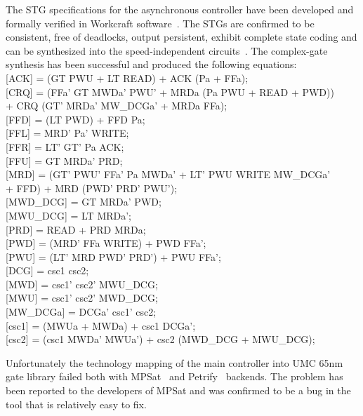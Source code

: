 \documentclass[twocolumn,conference]{IEEEtran}
\begin{document}
The STG specifications for the asynchronous controller have been developed and formally verified in Workcraft software~\cite{Sokolov-2016-book-Workcraft}. The STGs are confirmed to be consistent, free of deadlocks, output persistent, exhibit complete state coding and can be synthesized into the speed-independent circuits~\cite{Muller-1959-ts}. The complex-gate synthesis has been successful and produced the following equations:\\
\footnotesize
\textsf{[ACK] = (GT PWU + LT READ) + ACK (Pa + FFa);}\\
\textsf{[CRQ] = (FFa' GT MWDa' PWU' + MRDa (Pa PWU + READ + PWD))\\
\hspace*{25pt}+ CRQ (GT' MRDa' MW\_DCGa' + MRDa FFa);}\\
\textsf{[FFD] = (LT PWD) + FFD Pa;}\\
\textsf{[FFL] = MRD' Pa' WRITE;}\\
\textsf{[FFR] = LT' GT' Pa ACK;}\\
\textsf{[FFU] = GT MRDa' PRD;}\\
\textsf{[MRD] = (GT' PWU' FFa' Pa MWDa' + LT' PWU WRITE MW\_DCGa'\\
\hspace*{25pt}+ FFD) + MRD (PWD' PRD' PWU');}\\
\textsf{[MWD\_DCG] = GT MRDa' PWD;}\\
\textsf{[MWU\_DCG] = LT MRDa';}\\
\textsf{[PRD] = READ + PRD MRDa;}\\
\textsf{[PWD] = (MRD' FFa WRITE) + PWD FFa';}\\
\textsf{[PWU] = (LT' MRD PWD' PRD') + PWU FFa';}\\
\textsf{[DCG] = csc1 csc2;}\\
\textsf{[MWD] = csc1' csc2' MWU\_DCG;}\\
\textsf{[MWU] = csc1' csc2' MWD\_DCG;}\\
\textsf{[MW\_DCGa] = DCGa' csc1' csc2;}\\
\textsf{[csc1] = (MWUa + MWDa) + csc1 DCGa';}\\
\textsf{[csc2] = (csc1 MWDa' MWUa') + csc2 (MWD\_DCG + MWU\_DCG);}\\
\normalsize

Unfortunately the technology mapping of the main controller into UMC 65nm gate library failed both with MPSat~\cite{Khomenko-2009-TR-MPSat} and Petrify~\cite{Cortadella-1997-Petrify} backends. The problem has been reported to the developers of MPSat and was confirmed to be a bug in the tool that is relatively easy to fix.
\end{document}
